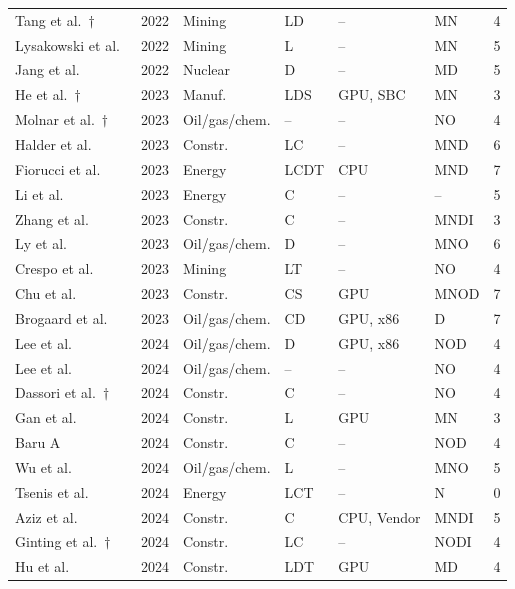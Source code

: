 \begin{longtable}{lllllll}
Tang et al.~\cite{inc:paper067}$\dagger$ & 2022 & Mining & LD & -- & MN & 4\\
Lysakowski et al.~\cite{inc:r2-0387} & 2022 & Mining & L & -- & MN & 5\\
Jang et al.~\cite{inc:r2-1156} & 2022 & Nuclear & D & -- & MD & 5\\
He et al.~\cite{inc:paper026}$\dagger$ & 2023 & Manuf. & LDS & GPU, SBC & MN & 3\\
Molnar et al.~\cite{inc:paper084}$\dagger$ & 2023 & Oil/gas/chem. & -- & -- & NO & 4\\
Halder et al.~\cite{inc:paper066} & 2023 & Constr. & LC & -- & MND & 6\\
Fiorucci et al.~\cite{inc:paper080} & 2023 & Energy & LCDT & CPU & MND & 7\\
Li et al.~\cite{inc:paper077} & 2023 & Energy & C & -- & -- & 5\\
Zhang et al.~\cite{inc:paper027} & 2023 & Constr. & C & -- & MNDI & 3\\
Ly et al.~\cite{inc:paper044} & 2023 & Oil/gas/chem. & D & -- & MNO & 6\\
Crespo et al.~\cite{inc:paper064} & 2023 & Mining & LT & -- & NO & 4\\
Chu et al.~\cite{inc:paper072} & 2023 & Constr. & CS & GPU & MNOD & 7\\
Brogaard et al.~\cite{inc:r2-0495} & 2023 & Oil/gas/chem. & CD & GPU, x86 & D & 7\\
Lee et al.~\cite{inc:paper021} & 2024 & Oil/gas/chem. & D & GPU, x86 & NOD & 4\\
Lee et al.~\cite{inc:paper068} & 2024 & Oil/gas/chem. & -- & -- & NO & 4\\
Dassori et al.~\cite{inc:paper006}$\dagger$ & 2024 & Constr. & C & -- & NO & 4\\
Gan et al.~\cite{inc:paper086} & 2024 & Constr. & L & GPU & MN & 3\\
Baru A~\cite{inc:paper079} & 2024 & Constr. & C & -- & NOD & 4\\
Wu et al.~\cite{inc:paper063} & 2024 & Oil/gas/chem. & L & -- & MNO & 5\\
Tsenis et al.~\cite{inc:paper081} & 2024 & Energy & LCT & -- & N & 0\\
Aziz et al.~\cite{inc:paper062} & 2024 & Constr. & C & CPU, Vendor & MNDI & 5\\
Ginting et al.~\cite{inc:paper071}$\dagger$ & 2024 & Constr. & LC & -- & NODI & 4\\
Hu et al.~\cite{inc:paper083} & 2024 & Constr. & LDT & GPU & MD & 4\\

\end{longtable}
